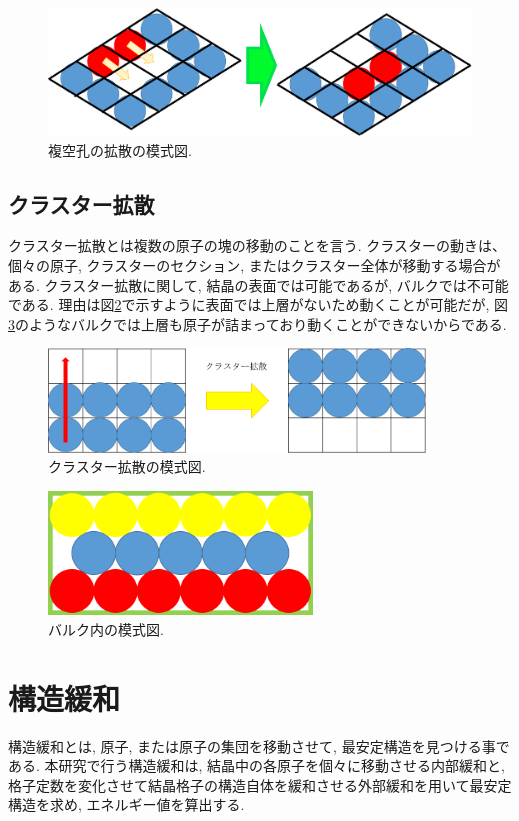 \begin{figure}[htbp]
	\begin{center}
		\includegraphics[width=130mm]{../intro/divacancy.png}
        \caption{複空孔の拡散の模式図.}
		\label{fig3}
	\end{center}
\end{figure}


\subsection{クラスター拡散}
クラスター拡散とは複数の原子の塊の移動のことを言う. クラスターの動きは、個々の原子, クラスターのセクション, またはクラスター全体が移動する場合がある.
クラスター拡散に関して, 結晶の表面では可能であるが, バルクでは不可能である.
理由は図\ref{fig4}で示すように表面では上層がないため動くことが可能だが, 図\ref{fig5}のようなバルクでは上層も原子が詰まっており動くことができないからである.

\begin{figure}[htbp]
	\begin{center}
		\includegraphics[width=100mm]{../intro/kakusan.png}
		\caption{クラスター拡散の模式図.}
		\label{fig4}
	\end{center}
\end{figure}

\begin{figure}[htbp]
	\begin{center}
		\includegraphics[width=70mm]{../intro/balc.png}
        \caption{バルク内の模式図.}
		\label{fig5}
	\end{center}
\end{figure}

\section{構造緩和}
構造緩和とは, 原子, または原子の集団を移動させて, 最安定構造を見つける事である. 本研究で行う構造緩和は, 結晶中の各原子を個々に移動させる内部緩和と, 格子定数を変化させて結晶格子の構造自体を緩和させる外部緩和を用いて最安定構造を求め, エネルギー値を算出する.

